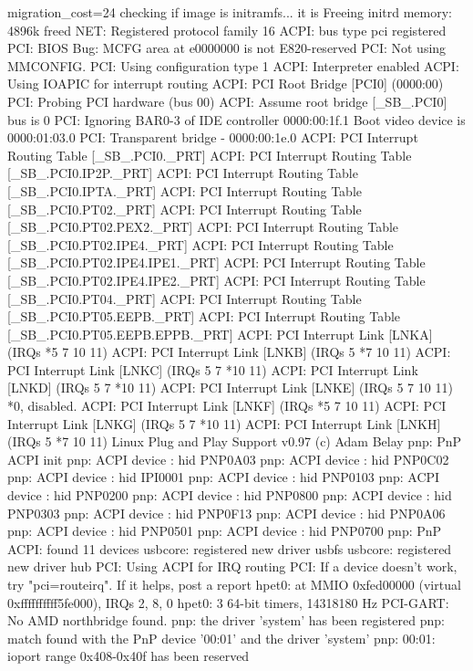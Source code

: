 \documentclass[mingoth,a4paper]{jsarticle}
\begin{document}
{{{{{\begin{commandline}
migration_cost=24
checking if image is initramfs... it is
Freeing initrd memory: 4896k freed
NET: Registered protocol family 16
ACPI: bus type pci registered
PCI: BIOS Bug: MCFG area at e0000000 is not E820-reserved
PCI: Not using MMCONFIG.
PCI: Using configuration type 1
ACPI: Interpreter enabled
ACPI: Using IOAPIC for interrupt routing
ACPI: PCI Root Bridge [PCI0] (0000:00)
PCI: Probing PCI hardware (bus 00)
ACPI: Assume root bridge [\_SB_.PCI0] bus is 0
PCI: Ignoring BAR0-3 of IDE controller 0000:00:1f.1
Boot video device is 0000:01:03.0
PCI: Transparent bridge - 0000:00:1e.0
ACPI: PCI Interrupt Routing Table [\_SB_.PCI0._PRT]
ACPI: PCI Interrupt Routing Table [\_SB_.PCI0.IP2P._PRT]
ACPI: PCI Interrupt Routing Table [\_SB_.PCI0.IPTA._PRT]
ACPI: PCI Interrupt Routing Table [\_SB_.PCI0.PT02._PRT]
ACPI: PCI Interrupt Routing Table [\_SB_.PCI0.PT02.PEX2._PRT]
ACPI: PCI Interrupt Routing Table [\_SB_.PCI0.PT02.IPE4._PRT]
ACPI: PCI Interrupt Routing Table [\_SB_.PCI0.PT02.IPE4.IPE1._PRT]
ACPI: PCI Interrupt Routing Table [\_SB_.PCI0.PT02.IPE4.IPE2._PRT]
ACPI: PCI Interrupt Routing Table [\_SB_.PCI0.PT04._PRT]
ACPI: PCI Interrupt Routing Table [\_SB_.PCI0.PT05.EEPB._PRT]
ACPI: PCI Interrupt Routing Table [\_SB_.PCI0.PT05.EEPB.EPPB._PRT]
ACPI: PCI Interrupt Link [LNKA] (IRQs *5 7 10 11)
ACPI: PCI Interrupt Link [LNKB] (IRQs 5 *7 10 11)
ACPI: PCI Interrupt Link [LNKC] (IRQs 5 7 *10 11)
ACPI: PCI Interrupt Link [LNKD] (IRQs 5 7 *10 11)
ACPI: PCI Interrupt Link [LNKE] (IRQs 5 7 10 11) *0, disabled.
ACPI: PCI Interrupt Link [LNKF] (IRQs *5 7 10 11)
ACPI: PCI Interrupt Link [LNKG] (IRQs 5 7 *10 11)
ACPI: PCI Interrupt Link [LNKH] (IRQs 5 *7 10 11)
Linux Plug and Play Support v0.97 (c) Adam Belay
pnp: PnP ACPI init
pnp: ACPI device : hid PNP0A03
pnp: ACPI device : hid PNP0C02
pnp: ACPI device : hid IPI0001
pnp: ACPI device : hid PNP0103
pnp: ACPI device : hid PNP0200
pnp: ACPI device : hid PNP0800
pnp: ACPI device : hid PNP0303
pnp: ACPI device : hid PNP0F13
pnp: ACPI device : hid PNP0A06
pnp: ACPI device : hid PNP0501
pnp: ACPI device : hid PNP0700
pnp: PnP ACPI: found 11 devices
usbcore: registered new driver usbfs
usbcore: registered new driver hub
PCI: Using ACPI for IRQ routing
PCI: If a device doesn't work, try "pci=routeirq".  If it helps, post a report
hpet0: at MMIO 0xfed00000 (virtual 0xffffffffff5fe000), IRQs 2, 8, 0
hpet0: 3 64-bit timers, 14318180 Hz
PCI-GART: No AMD northbridge found.
pnp: the driver 'system' has been registered
pnp: match found with the PnP device '00:01' and the driver 'system'
pnp: 00:01: ioport range 0x408-0x40f has been reserved

\end{commandline}}}}}}
\end{document}
